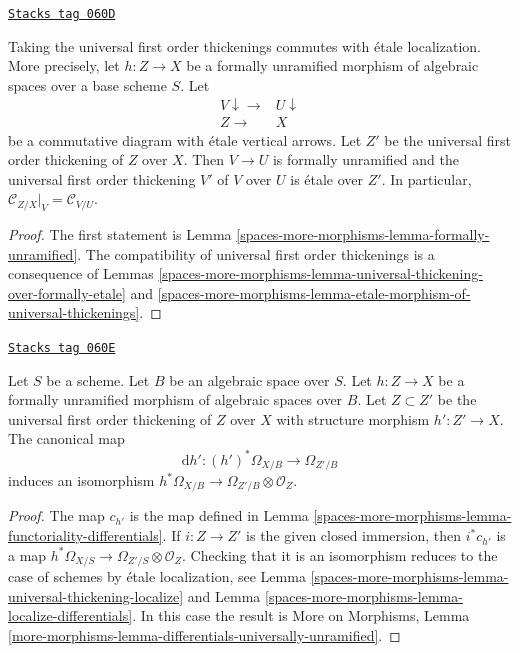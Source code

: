 \begin{lemma}
\label{spaces-more-morphisms-lemma-universal-thickening-localize}
\href{https://stacks.math.columbia.edu/tag/060D}{\texttt{Stacks tag 060D}}

Taking the universal first order thickenings commutes with \'etale
localization. More precisely, let $h : Z \to X$ be a formally unramified
morphism of algebraic spaces over a base scheme $S$.
Let
$$
\begin{array}{cc}V \downarrow\longrightarrow & U \downarrow \\ Z \longrightarrow & X\end{array}
$$
be a commutative diagram with \'etale vertical arrows.
Let $Z'$ be the universal first order thickening of $Z$ over $X$.
Then $V \to U$ is formally unramified and the universal first
order thickening $V'$ of $V$ over $U$ is \'etale over $Z'$.
In particular, $\mathcal{C}_{Z/X}|_V = \mathcal{C}_{V/U}$.
\end{lemma}

\begin{proof}
The first statement is
Lemma \ref{spaces-more-morphisms-lemma-formally-unramified}.
The compatibility of universal first order thickenings is
a consequence of
Lemmas \ref{spaces-more-morphisms-lemma-universal-thickening-over-formally-etale} and
\ref{spaces-more-morphisms-lemma-etale-morphism-of-universal-thickenings}.
\end{proof}

\begin{lemma}
\label{spaces-more-morphisms-lemma-differentials-universally-unramified}
\href{https://stacks.math.columbia.edu/tag/060E}{\texttt{Stacks tag 060E}}

Let $S$ be a scheme. Let $B$ be an algebraic space over $S$.
Let $h : Z \to X$ be a formally unramified morphism of algebraic spaces
over $B$. Let $Z \subset Z'$ be the universal first order thickening of $Z$
over $X$ with structure morphism $h' : Z' \to X$. The canonical map
$$
\text{d}h' : (h')^*\Omega_{X/B} \to \Omega_{Z'/B}
$$
induces an isomorphism
$h^*\Omega_{X/B} \to \Omega_{Z'/B} \otimes \mathcal{O}_Z$.
\end{lemma}

\begin{proof}
The map $c_{h'}$ is the map defined in
Lemma \ref{spaces-more-morphisms-lemma-functoriality-differentials}.
If $i : Z \to Z'$ is the given closed immersion, then
$i^*c_{h'}$ is a map
$h^*\Omega_{X/S} \to \Omega_{Z'/S} \otimes \mathcal{O}_Z$.
Checking that it is an isomorphism reduces to the case of schemes
by \'etale localization, see
Lemma \ref{spaces-more-morphisms-lemma-universal-thickening-localize}
and
Lemma \ref{spaces-more-morphisms-lemma-localize-differentials}.
In this case the result is
More on Morphisms,
Lemma \ref{more-morphisms-lemma-differentials-universally-unramified}.
\end{proof}

